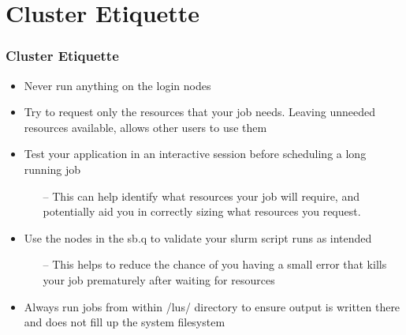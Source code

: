 \section{Cluster Etiquette}
\begin{frame}
  \frametitle{Cluster Etiquette}
  \begin{itemize}
  \item Never run anything on the login nodes
  \item Try to request only the resources that your job needs.  Leaving unneeded resources available, allows other users to use them
  \item Test your application in an interactive session before scheduling a long running job
    \begin{itemize}
    \item[--] This can help identify what resources your job will require, and potentially aid you in correctly sizing what resources you request.
    \end{itemize}
  \item Use the nodes in the sb.q to validate your slurm script runs as intended
    \begin{itemize}
    \item[--] This helps to reduce the chance of you having a small error that kills your job prematurely after waiting for resources
    \end{itemize}
  \item Always run jobs from within {\ctilde}/lus/ directory to ensure output is written there and does not fill up the system filesystem
  \end{itemize}
\end{frame}
